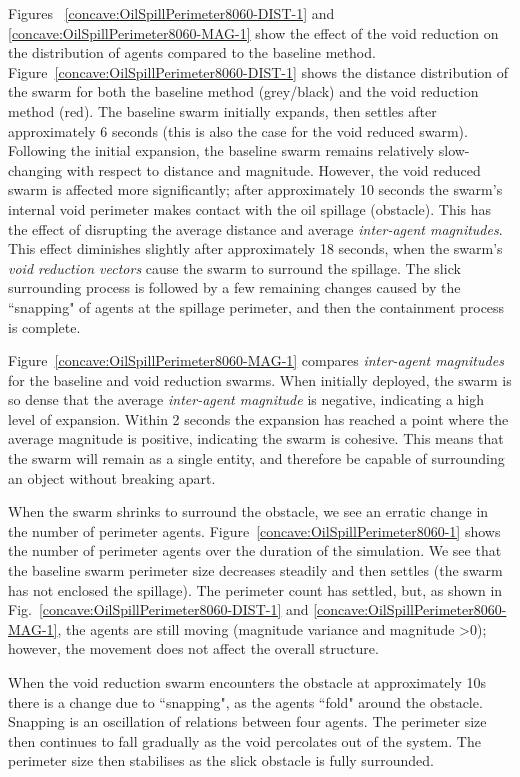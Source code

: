 \documentclass[letterpaper]{article}
\begin{document}
Figures ~\ref{concave:OilSpillPerimeter8060-DIST-1} and \ref{concave:OilSpillPerimeter8060-MAG-1} show the effect of the void reduction on the distribution of agents compared to the baseline method. Figure~\ref{concave:OilSpillPerimeter8060-DIST-1} shows the distance distribution of the swarm for both the baseline method (grey/black) and the void reduction method (red). The baseline swarm initially expands, then settles after approximately 6 seconds (this is also the case for the void reduced swarm). Following the initial expansion, the baseline swarm remains relatively slow-changing with respect to distance and magnitude. However, the void reduced swarm is affected more significantly; after approximately 10 seconds the swarm's internal void perimeter makes contact with the oil spillage (obstacle). This has the effect of disrupting the average distance and average \textit{inter-agent magnitudes}. This effect diminishes slightly after approximately 18 seconds, when the swarm's \textit{void reduction vectors} cause the swarm to surround the spillage. The slick surrounding process is followed by a few remaining changes caused by the ``snapping" of agents at the spillage perimeter, and then the containment process is complete.

Figure~\ref{concave:OilSpillPerimeter8060-MAG-1} compares \textit{inter-agent magnitudes} for the baseline and void reduction swarms. When initially deployed, the swarm is so dense that the average \textit{inter-agent magnitude} is negative, indicating a high level of expansion. Within 2 seconds the expansion has reached a point where the average magnitude is positive, indicating the swarm is cohesive. This means that the swarm will remain as a single entity, and therefore be capable of surrounding an object without breaking apart.


When the swarm shrinks to surround the obstacle, we see an erratic change in the number of perimeter agents. Figure~\ref{concave:OilSpillPerimeter8060-1} shows the number of perimeter agents over the duration of the simulation. We see that the baseline swarm perimeter size decreases steadily and then settles (the swarm has not enclosed the spillage). The perimeter count has settled, but, as shown in Fig.~\ref{concave:OilSpillPerimeter8060-DIST-1} and \ref{concave:OilSpillPerimeter8060-MAG-1}, the agents are still moving (magnitude variance and magnitude \textgreater 0); however, the movement does not affect the overall structure. 

When the void reduction swarm encounters the obstacle at approximately 10s there is a change due to ``snapping", as the agents ``fold" around the obstacle. Snapping is an oscillation of relations between four agents. The perimeter size then continues to fall gradually as the void percolates out of the system. The perimeter size then stabilises as the slick obstacle is fully surrounded.
\end{document}
